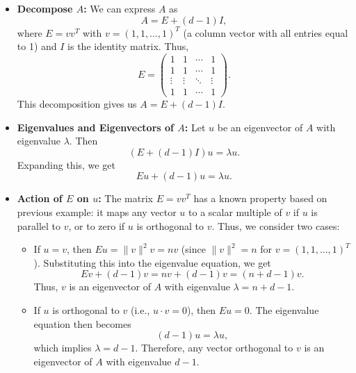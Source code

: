 \documentclass{article}
\begin{document}
\begin{itemize}
    \item \textbf{Decompose \( A \):} We can express \( A \) as
          \[
              A = E + (d-1) I,
          \]
          where \( E = v v^T \) with \( v = (1, 1, \dots, 1)^T \) (a column vector with all entries equal to 1) and \( I \) is the identity matrix. Thus,
          \[
              E = \left( \begin{array}{cccc}
                      1      & 1      & \cdots & 1      \\
                      1      & 1      & \cdots & 1      \\
                      \vdots & \vdots & \ddots & \vdots \\
                      1      & 1      & \cdots & 1
                  \end{array} \right).
          \]
          This decomposition gives us \( A = E + (d-1) I \).

    \item \textbf{Eigenvalues and Eigenvectors of \( A \):} Let \( u \) be an eigenvector of \( A \) with eigenvalue \( \lambda \). Then
          \[
              (E + (d-1) I) u = \lambda u.
          \]
          Expanding this, we get
          \[
              E u + (d-1) u = \lambda u.
          \]

    \item \textbf{Action of \( E \) on \( u \):} The matrix \( E = v v^T \) has a known property based on previous example: it maps any vector \( u \) to a scalar multiple of \( v \) if \( u \) is parallel to \( v \), or to zero if \( u \) is orthogonal to \( v \). Thus, we consider two cases:

          \begin{itemize}
              \item If \( u = v \), then \( E u = \| v \|^2 v = n v \) (since \( \| v \|^2 = n \) for \( v = (1, 1, \dots, 1)^T \)). Substituting this into the eigenvalue equation, we get
                    \[
                        E v + (d-1) v = n v + (d-1) v = (n + d - 1) v.
                    \]
                    Thus, \( v \) is an eigenvector of \( A \) with eigenvalue \( \lambda = n + d - 1 \).

              \item If \( u \) is orthogonal to \( v \) (i.e., \( u \cdot v = 0 \)), then \( E u = 0 \). The eigenvalue equation then becomes
                    \[
                        (d-1) u = \lambda u,
                    \]
                    which implies \( \lambda = d - 1 \). Therefore, any vector orthogonal to \( v \) is an eigenvector of \( A \) with eigenvalue \( d - 1 \).
          \end{itemize}
\end{itemize}
\end{document}

